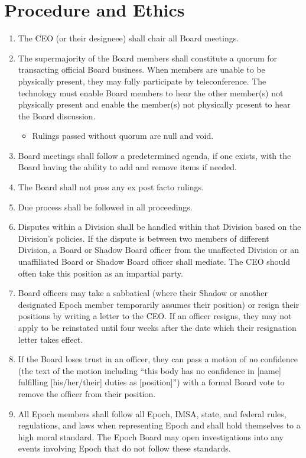 \documentclass{article}
\begin{document}
\section{Procedure and Ethics}
\begin{enumerate}
    \item The CEO (or their designeee) shall chair all Board meetings.
        \item The supermajority of the Board members shall constitute a quorum for transacting official Board business. When members are unable to be physically present, they may fully participate by teleconference. The technology must enable Board members to hear the other member(s) not physically present and enable the member(s) not physically present to hear the Board discussion.
    \begin{itemize}
        \item Rulings passed without quorum are null and void.
    \end{itemize}
    \item Board meetings shall follow a predetermined agenda, if one exists, with the Board having the ability to add and remove items if needed.
    \item The Board shall not pass any ex post facto rulings.
    \item Due process shall be followed in all proceedings.
    \item Disputes within a Division shall be handled within that Division based on the Division's policies. If the dispute is between two members of different Division, a Board or Shadow Board officer from the unaffected Division or an unaffiliated Board or Shadow Board officer shall mediate. The CEO should often take this position as an impartial party.
    \item Board officers may take a sabbatical (where their Shadow or another designated Epoch member temporarily assumes their position) or resign their positions by writing a letter to the CEO. If an officer resigns, they may not apply to be reinstated until four weeks after the date which their resignation letter takes effect.
    \item If the Board loses trust in an officer, they can pass a motion of no confidence (the text of the motion including ``this body has no confidence in [name] fulfilling [his/her/their] duties as [position]'') with a formal Board vote to remove the officer from their position.
    \item All Epoch members shall follow all Epoch, IMSA, state, and federal rules, regulations, and laws when representing Epoch and shall hold themselves to a high moral standard. The Epoch Board may open investigations into any events involving Epoch that do not follow these standards.

\end{enumerate}
\end{document}
